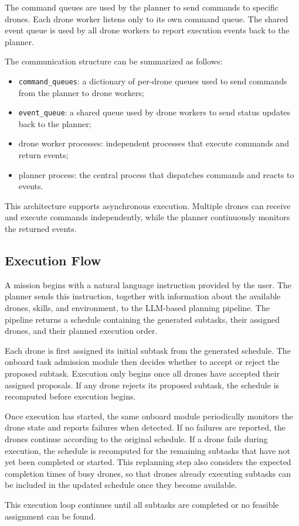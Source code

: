 The command queues are used by the planner to send commands to specific drones. 
Each drone worker listens only to its own command queue. 
The shared event queue is used by all drone workers to report execution events back to the planner.

The communication structure can be summarized as follows:

\begin{itemize}
    \item \texttt{command\_queues}: a dictionary of per-drone queues used to send commands from the planner to drone workers;
    \item \texttt{event\_queue}: a shared queue used by drone workers to send status updates back to the planner;
    \item drone worker processes: independent processes that execute commands and return events;
    \item planner process: the central process that dispatches commands and reacts to events.
\end{itemize}

This architecture supports asynchronous execution. 
Multiple drones can receive and execute commands independently, while the planner continuously monitors the returned events.

\subsection{Execution Flow}

A mission begins with a natural language instruction provided by the user. 
The planner sends this instruction, together with information about the available drones, skills, and environment, 
to the LLM-based planning pipeline. 
The pipeline returns a schedule containing the generated subtasks, their assigned drones, and their planned execution order.

Each drone is first assigned its initial subtask from the generated schedule. 
The onboard task admission module then decides whether to accept or reject the proposed subtask. 
Execution only begins once all drones have accepted their assigned proposals.
If any drone rejects its proposed subtask, the schedule is recomputed before execution begins. 

Once execution has started, the same onboard module periodically monitors the drone state and reports failures when detected. 
If no failures are reported, the drones continue according to the original schedule. 
If a drone fails during execution, the schedule is recomputed for the remaining subtasks that have not yet been completed or started. 
This replanning step also considers the expected completion times of busy drones, 
so that drones already executing subtasks can be included in the updated schedule once they become available.

This execution loop continues until all subtasks are completed or no feasible assignment can be found.

